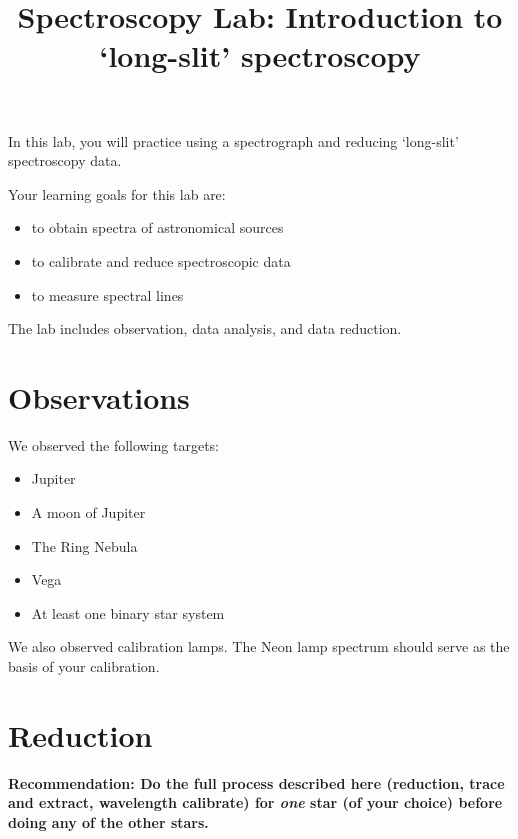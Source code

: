 \documentclass[11pt]{article}
\begin{document}
\title{Spectroscopy Lab: Introduction to `long-slit' spectroscopy}
\maketitle

In this lab, you will practice using a spectrograph and reducing `long-slit'
spectroscopy data.

Your learning goals for this lab are:

\begin{itemize}
    \item to obtain spectra of astronomical sources
    \item to calibrate and reduce spectroscopic data
    \item to measure spectral lines
\end{itemize}

The lab includes observation, data analysis, and data reduction.




\section{Observations}

We observed the following targets:

\begin{itemize}
    \item Jupiter
    \item A moon of Jupiter
    \item The Ring Nebula
    \item Vega
    \item At least one binary star system
\end{itemize}

We also observed calibration lamps.  The Neon lamp spectrum should serve as the basis of your calibration.

\section{Reduction}
\textbf{Recommendation: Do the full process described here (reduction, trace
and extract, wavelength calibrate) for \emph{one} star (of your choice) before
doing any of the other stars.}
\end{document}
